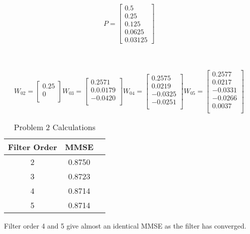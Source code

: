 \documentclass[12pt]{article}
\newenvironment{problem}[2][Problem]{\begin{trivlist}
\item[\hskip \labelsep {\bfseries #1}\hskip \labelsep {\bfseries #2.}]}{\end{trivlist}}
\begin{document}
\begin{problem}{2}
\text{ }
\[
P=
  \begin{bmatrix}
    0.5 \\
    0.25 \\
    0.125\\
    0.0625\\
    0.03125
  \end{bmatrix}
\]\\
\end{problem}
\\
\[
W_02=
    \begin{bmatrix}
    0.25\\
    0\\
    \end{bmatrix}%
%
W_03=
    \begin{bmatrix}
    0.2571\\
    0.0.0179\\
    -0.0420\\
    \end{bmatrix}
W_04=
    \begin{bmatrix}
    0.2575\\
    0.0219\\
    -0.0325\\
    -0.0251\\
    \end{bmatrix}
W_05=
    \begin{bmatrix}
    0.2577\\
    0.0217\\
    -0.0331\\
    -0.0266\\
    0.0037\\
    \end{bmatrix}
\]
\begin{table}[H]
\centering
 \begin{tabular}{ | c | c | c |}
    \hline
    Filter Order & MMSE \\
    \hline\hline
    2        & 0.8750 \\
    \hline
    3        & 0.8723 \\
    \hline
    4        & 0.8714 \\
    \hline
    5        & 0.8714 \\
    \hline
  \end{tabular}
  \caption{Problem 2 Calculations}
  \label{table:calcs}
\end{table}
Filter order 4 and 5 give almost an identical MMSE as the filter has converged.\\
\newpage
\end{document}
